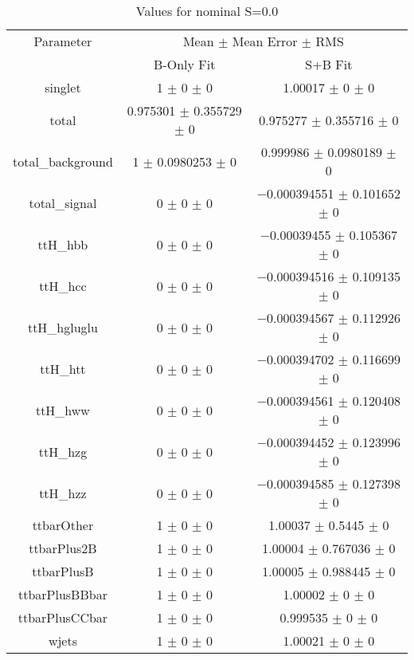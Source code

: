 \begin{table}
\centering
\caption{Values for nominal S=0.0}
\begin{tabular}{ccc}
\toprule
Parameter & \multicolumn{2}{c}{Mean $\pm$ Mean Error $\pm$ RMS}\\
 & B-Only Fit & S+B Fit\\
\midrule
singlet & \num{1} $\pm$ \num{0} $\pm$ \num{0} & \num{1.00017} $\pm$ \num{0} $\pm$ \num{0}\\
total & \num{0.975301} $\pm$ \num{0.355729} $\pm$ \num{0} & \num{0.975277} $\pm$ \num{0.355716} $\pm$ \num{0}\\
total\_background & \num{1} $\pm$ \num{0.0980253} $\pm$ \num{0} & \num{0.999986} $\pm$ \num{0.0980189} $\pm$ \num{0}\\
total\_signal & \num{0} $\pm$ \num{0} $\pm$ \num{0} & \num{-0.000394551} $\pm$ \num{0.101652} $\pm$ \num{0}\\
ttH\_hbb & \num{0} $\pm$ \num{0} $\pm$ \num{0} & \num{-0.00039455} $\pm$ \num{0.105367} $\pm$ \num{0}\\
ttH\_hcc & \num{0} $\pm$ \num{0} $\pm$ \num{0} & \num{-0.000394516} $\pm$ \num{0.109135} $\pm$ \num{0}\\
ttH\_hgluglu & \num{0} $\pm$ \num{0} $\pm$ \num{0} & \num{-0.000394567} $\pm$ \num{0.112926} $\pm$ \num{0}\\
ttH\_htt & \num{0} $\pm$ \num{0} $\pm$ \num{0} & \num{-0.000394702} $\pm$ \num{0.116699} $\pm$ \num{0}\\
ttH\_hww & \num{0} $\pm$ \num{0} $\pm$ \num{0} & \num{-0.000394561} $\pm$ \num{0.120408} $\pm$ \num{0}\\
ttH\_hzg & \num{0} $\pm$ \num{0} $\pm$ \num{0} & \num{-0.000394452} $\pm$ \num{0.123996} $\pm$ \num{0}\\
ttH\_hzz & \num{0} $\pm$ \num{0} $\pm$ \num{0} & \num{-0.000394585} $\pm$ \num{0.127398} $\pm$ \num{0}\\
ttbarOther & \num{1} $\pm$ \num{0} $\pm$ \num{0} & \num{1.00037} $\pm$ \num{0.5445} $\pm$ \num{0}\\
ttbarPlus2B & \num{1} $\pm$ \num{0} $\pm$ \num{0} & \num{1.00004} $\pm$ \num{0.767036} $\pm$ \num{0}\\
ttbarPlusB & \num{1} $\pm$ \num{0} $\pm$ \num{0} & \num{1.00005} $\pm$ \num{0.988445} $\pm$ \num{0}\\
ttbarPlusBBbar & \num{1} $\pm$ \num{0} $\pm$ \num{0} & \num{1.00002} $\pm$ \num{0} $\pm$ \num{0}\\
ttbarPlusCCbar & \num{1} $\pm$ \num{0} $\pm$ \num{0} & \num{0.999535} $\pm$ \num{0} $\pm$ \num{0}\\
wjets & \num{1} $\pm$ \num{0} $\pm$ \num{0} & \num{1.00021} $\pm$ \num{0} $\pm$ \num{0}\\
\bottomrule
\end{tabular}
\end{table}